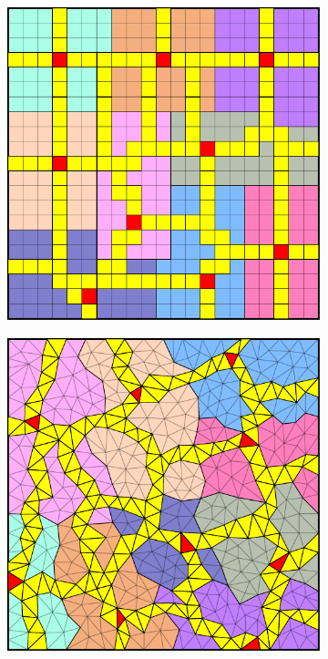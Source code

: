 \begin{figure}[htbp]
\begin{subfigure}[t]{0.3\textwidth}
  \end{subfigure}
  \hfill
  \begin{subfigure}[t]{0.3\textwidth}
    \centerline{\includegraphics[width=0.9\linewidth]{figs/square/square_cart_metis_cell_dual}}
  \end{subfigure}
  \hfill
  \begin{subfigure}[t]{0.3\textwidth}
    \centerline{\includegraphics[width=0.9\linewidth]{figs/square/square_tria_metis_cell_dual}}

\end{subfigure}
\end{figure}
